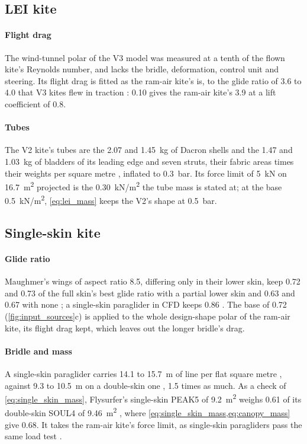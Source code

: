 \subsection{LEI kite}
\label{sec:det_lei}

\paragraph{Flight drag} The wind-tunnel polar of the V3 model \citep{poland2025} was measured at a tenth of the flown kite's Reynolds number, and lacks the bridle, deformation, control unit and steering. Its flight drag is fitted as the ram-air kite's is, to the glide ratio of 3.6 to 4.0 that V3 kites flew in traction \citep{vandervlugt2019}: 0.10 gives the ram-air kite's 3.9 at a lift coefficient of 0.8.

\paragraph{Tubes} The V2 kite's tubes are the 2.07 and 1.45~kg of Dacron shells and the 1.47 and 1.03~kg of bladders of its leading edge and seven struts, their fabric areas times their weights per square metre \citep[Table~2-1]{schwoll2012}, inflated to 0.3~bar. Its force limit of \SI{5}{kN} \citep{vandervlugt2013} on \SI{16.7}{m^2} projected is the \SI{0.30}{kN/m^2} the tube mass is stated at; at the base \SI{0.5}{kN/m^2}, \cref{eq:lei_mass} keeps the V2's shape at 0.5~bar.

\subsection{Single-skin kite}
\label{sec:det_single}

\paragraph{Glide ratio} Maughmer's wings of aspect ratio 8.5, differing only in their lower skin, keep 0.72 and 0.73 of the full skin's best glide ratio with a partial lower skin and 0.63 and 0.67 with none \citep[Figs.~9--10]{maughmer1979}; a single-skin paraglider in CFD keeps 0.86 \citep[Table~5]{maslanka2024}. The base of 0.72 (\cref{fig:input_sources}c) is applied to the whole design-shape polar of the ram-air kite, its flight drag kept, which leaves out the longer bridle's drag.

\paragraph{Bridle and mass} A single-skin paraglider carries 14.1 to \SI{15.7}{m} of line per flat square metre \citep[p.~2]{niviuk_skin3}, against 9.3 to \SI{10.5}{m} on a double-skin one \citep[p.~2]{niviuk_ikumap}, 1.5 times as much. As a check of \cref{eq:single_skin_mass}, Flysurfer's single-skin PEAK5 of \SI{9.2}{m^2} weighs 0.61 of its double-skin SOUL4 of \SI{9.46}{m^2} \citep{flysurfer_peak5,flysurfer_soul4}, where \cref{eq:single_skin_mass,eq:canopy_mass} give 0.68. It takes the ram-air kite's force limit, as single-skin paragliders pass the same load test \citep{ozone_xxlite}.

